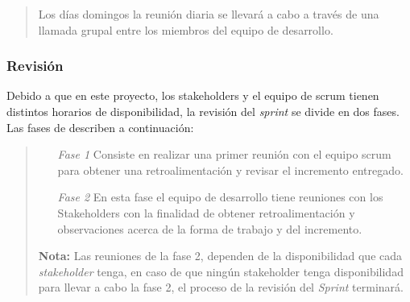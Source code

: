 
    \begin{quote}
    Los días domingos la reunión diaria se llevará a cabo a través de una llamada grupal
    entre los miembros del equipo de desarrollo.
    \end{quote}

\subsubsection{Revisión}

 \noindent Debido a que en este proyecto, los stakeholders y el equipo de scrum
 tienen distintos horarios de disponibilidad, la revisión del {\it sprint} se divide
 en dos fases.\\%
 Las fases de describen a continuación:

    \begin{quote}
    \begin{itemize}
    \item[\it Fase 1]
        Consiste en realizar una primer reunión con el equipo scrum para obtener una
        retroalimentación y revisar el incremento entregado.

    \item[\it Fase 2]
        En esta fase el equipo de desarrollo tiene reuniones con los Stakeholders con
        la finalidad de obtener retroalimentación y observaciones acerca de la forma
        de trabajo y del incremento.


    \end{itemize}

    {\bf Nota:} Las reuniones de la fase 2, dependen de la disponibilidad que cada
                {\it stakeholder} tenga, en caso de que ningún stakeholder tenga
                disponibilidad para llevar a cabo la fase 2, el proceso de la
                revisión del {\it Sprint} terminará.
    \end{quote}

